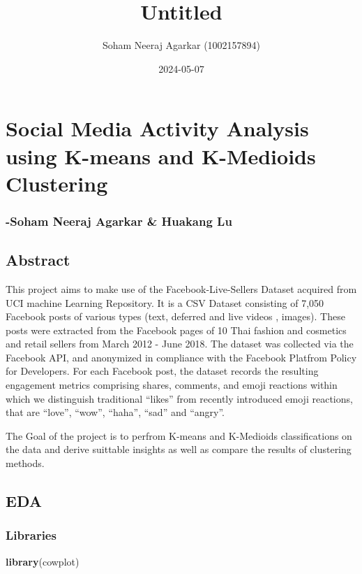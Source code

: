 \documentclass[
]{article}
\title{Untitled}
\author{Soham Neeraj Agarkar (1002157894)}
\date{2024-05-07}
\newenvironment{Shaded}{\begin{snugshade}}{\end{snugshade}}
\newcommand{\FunctionTok}[1]{\textcolor[rgb]{0.13,0.29,0.53}{\textbf{#1}}}
\newcommand{\NormalTok}[1]{#1}
\begin{document}
\maketitle

\section{Social Media Activity Analysis using K-means and K-Medioids
Clustering}\label{social-media-activity-analysis-using-k-means-and-k-medioids-clustering}

\subsubsection{-Soham Neeraj Agarkar \& Huakang
Lu}\label{soham-neeraj-agarkar-huakang-lu}

\subsection{Abstract}\label{abstract}

This project aims to make use of the Facebook-Live-Sellers Dataset
acquired from UCI machine Learning Repository. It is a CSV Dataset
consisting of 7,050 Facebook posts of various types (text, deferred and
live videos , images). These posts were extracted from the Facebook
pages of 10 Thai fashion and cosmetics and retail sellers from March
2012 - June 2018. The dataset was collected via the Facebook API, and
anonymized in compliance with the Facebook Platfrom Policy for
Developers. For each Facebook post, the dataset records the resulting
engagement metrics comprising shares, comments, and emoji reactions
within which we distinguish traditional ``likes'' from recently
introduced emoji reactions, that are ``love'', ``wow'', ``haha'',
``sad'' and ``angry''.

The Goal of the project is to perfrom K-means and K-Medioids
classifications on the data and derive suittable insights as well as
compare the results of clustering methods.

\subsection{EDA}\label{eda}

\subsubsection{Libraries}\label{libraries}

\begin{Shaded}
\begin{Highlighting}[]
\FunctionTok{library}\NormalTok{(cowplot)}
\end{Highlighting}
\end{Shaded}
\end{document}
